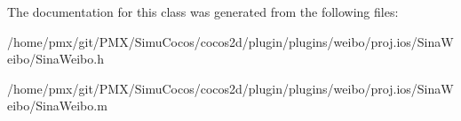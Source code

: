 The documentation for this class was generated from the following files\+:\begin{DoxyCompactItemize}
\item 
/home/pmx/git/\+P\+M\+X/\+Simu\+Cocos/cocos2d/plugin/plugins/weibo/proj.\+ios/\+Sina\+Weibo/Sina\+Weibo.\+h\item 
/home/pmx/git/\+P\+M\+X/\+Simu\+Cocos/cocos2d/plugin/plugins/weibo/proj.\+ios/\+Sina\+Weibo/Sina\+Weibo.\+m\end{DoxyCompactItemize}
